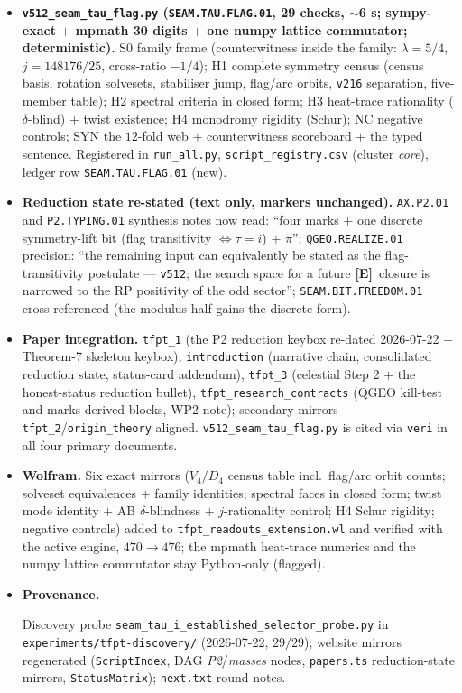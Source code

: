 \documentclass[11pt]{article}
\providecommand{\mE}{\textbf{[E]}}\providecommand{\mC}{\textbf{[C]}}
\begin{document}
\begin{itemize}[leftmargin=1.5em]
\item \textbf{\texttt{v512\_seam\_tau\_flag.py} (\texttt{SEAM.TAU.FLAG.01}, 29 checks, $\sim$6 s;
sympy-exact $+$ mpmath 30 digits $+$ one numpy lattice commutator; deterministic).} S0 family
frame (counterwitness inside the family: $\lambda=5/4$, $j=148176/25$, cross-ratio $-1/4$); H1
complete symmetry census (census basis, rotation solvesets, stabiliser jump, flag/arc orbits,
\texttt{v216} separation, five-member table); H2 spectral criteria in closed form; H3 heat-trace
rationality ($\delta$-blind) $+$ twist existence; H4 monodromy rigidity (Schur); NC negative
controls; SYN the $12$-fold web $+$ counterwitness scoreboard $+$ the typed sentence. Registered
in \texttt{run\_all.py}, \texttt{script\_registry.csv} (cluster \emph{core}), ledger row
\texttt{SEAM.TAU.FLAG.01} (new).
\item \textbf{Reduction state re-stated (text only, markers unchanged).} \texttt{AX.P2.01} and
\texttt{P2.TYPING.01} synthesis notes now read: ``four marks $+$ one discrete symmetry-lift bit
(flag transitivity $\iff\tau=i$) $+$ $\pi$''; \texttt{QGEO.REALIZE.01} precision: ``the remaining
input can equivalently be stated as the flag-transitivity postulate --- \texttt{v512}; the search
space for a future \mE\ closure is narrowed to the RP positivity of the odd sector'';
\texttt{SEAM.BIT.FREEDOM.01} cross-referenced (the modulus half gains the discrete form).
\item \textbf{Paper integration.} \texttt{tfpt\_1} (the P2 reduction keybox re-dated 2026-07-22
$+$ Theorem-7 skeleton keybox), \texttt{introduction} (narrative chain, consolidated reduction
state, status-card addendum), \texttt{tfpt\_3} (celestial Step 2 $+$ the honest-status reduction
bullet), \texttt{tfpt\_research\_contracts} (QGEO kill-test and marks-derived blocks, WP2 note);
secondary mirrors \texttt{tfpt\_2}/\texttt{origin\_theory} aligned.
\texttt{v512\_seam\_tau\_flag.py} is cited via \texttt{veri} in all four primary documents.
\item \textbf{Wolfram.} Six exact mirrors ($V_4/D_4$ census table incl.\ flag/arc orbit counts;
solveset equivalences $+$ family identities; spectral faces in closed form; twist mode identity
$+$ AB $\delta$-blindness $+$ $j$-rationality control; H4 Schur rigidity; negative controls) added
to \texttt{tfpt\_readouts\_extension.wl} and verified with the active engine, $470\to476$; the
mpmath heat-trace numerics and the numpy lattice commutator stay Python-only (flagged).
\item \textbf{Provenance.} \begingroup\raggedright Discovery probe
\texttt{seam\_tau\_i\_established\_selector\_probe.py}
in \texttt{experiments/tfpt-discovery/} (2026-07-22,
$29/29$); website mirrors regenerated (\texttt{ScriptIndex}, DAG \emph{P2}/\emph{masses} nodes,
\texttt{papers.ts} reduction-state mirrors, \texttt{StatusMatrix}); \texttt{next.txt} round
notes.\par\endgroup
\end{itemize}
\end{document}

